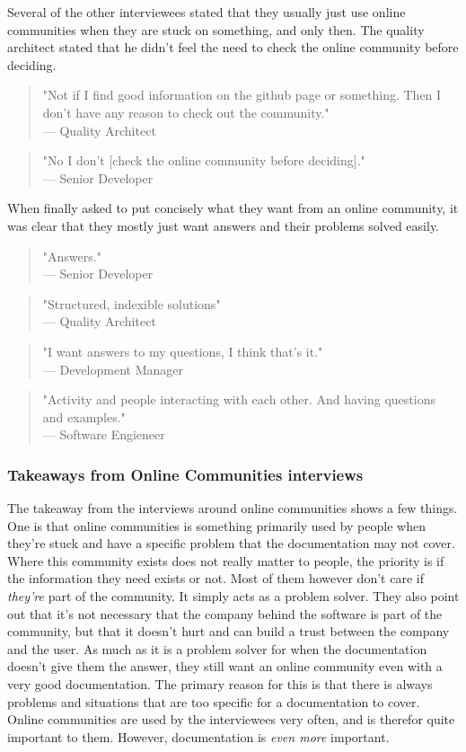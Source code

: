 \documentclass{cslthse-msc}
\begin{document}
    Several of the other interviewees stated that they usually just use online communities when they are stuck on something, and only then. The quality architect stated that he didn't feel the need to check the online community before deciding.
    \begin{quote}
        "Not if I find good information on the github page or something. Then I don't have any reason to check out the community."\\--- Quality Architect
    \end{quote}
    \begin{quote}
        "No I don't [check the online community before deciding]." \\--- Senior Developer
    \end{quote}
    When finally asked to put concisely what they want from an online community, it was clear that they mostly just want answers and their problems solved easily.
    \begin{quote}
        "Answers."\\
        --- Senior Developer
    \end{quote}
    \begin{quote}
        "Structured, indexible solutions"\\ --- Quality Architect
    \end{quote}
    \begin{quote}
        "I want answers to my questions, I think that's it." \\ --- Development Manager
    \end{quote}
    \begin{quote}
        "Activity and people interacting with each other. And having questions and examples."\\--- Software Engieneer
    \end{quote}
    \subsubsection{Takeaways from Online Communities interviews}
    The takeaway from the interviews around online communities shows a few things. One is that online communities is something primarily used by people when they're stuck and have a specific problem that the documentation may not cover. Where this community exists does not really matter to people, the priority is if the information they need exists or not. Most of them however don't care if \textit{they're} part of the community. It simply acts as a problem solver. They also point out that it's not necessary that the company behind the software is part of the community, but that it doesn't hurt and can build a trust between the company and the user. As much as it is a problem solver for when the documentation doesn't give them the answer, they still want an online community even with a very good documentation. The primary reason for this is that there is always problems and situations that are too specific for a documentation to cover. Online communities are used by the interviewees very often, and is therefor quite important to them. However, documentation is \textit{even more} important.
\end{document}
